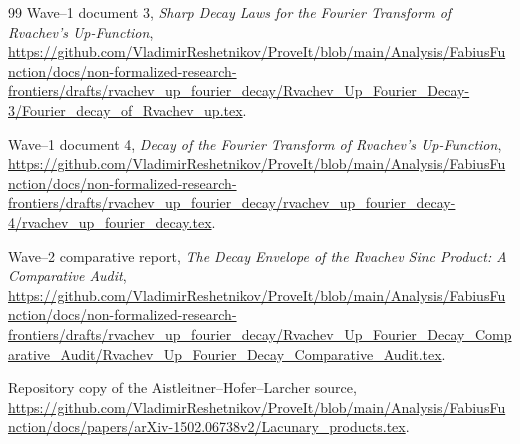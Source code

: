 \documentclass[11pt,oneside]{article}
\theoremstyle{definition}
\theoremstyle{remark}
\begin{document}
\begin{thebibliography}{99}
\newblock Wave--1 document 3,
\newblock \emph{Sharp Decay Laws for the Fourier Transform of Rvachev's Up-Function},
\newblock \url{https://github.com/VladimirReshetnikov/ProveIt/blob/main/Analysis/FabiusFunction/docs/non-formalized-research-frontiers/drafts/rvachev_up_fourier_decay/Rvachev_Up_Fourier_Decay-3/Fourier_decay_of_Rvachev_up.tex}.

\newblock Wave--1 document 4,
\newblock \emph{Decay of the Fourier Transform of Rvachev's Up-Function},
\newblock \url{https://github.com/VladimirReshetnikov/ProveIt/blob/main/Analysis/FabiusFunction/docs/non-formalized-research-frontiers/drafts/rvachev_up_fourier_decay/rvachev_up_fourier_decay-4/rvachev_up_fourier_decay.tex}.

\newblock Wave--2 comparative report,
\newblock \emph{The Decay Envelope of the Rvachev Sinc Product: A Comparative Audit},
\newblock \url{https://github.com/VladimirReshetnikov/ProveIt/blob/main/Analysis/FabiusFunction/docs/non-formalized-research-frontiers/drafts/rvachev_up_fourier_decay/Rvachev_Up_Fourier_Decay_Comparative_Audit/Rvachev_Up_Fourier_Decay_Comparative_Audit.tex}.

\newblock Repository copy of the Aistleitner--Hofer--Larcher source,
\newblock \url{https://github.com/VladimirReshetnikov/ProveIt/blob/main/Analysis/FabiusFunction/docs/papers/arXiv-1502.06738v2/Lacunary_products.tex}.

\end{thebibliography}
\end{document}
